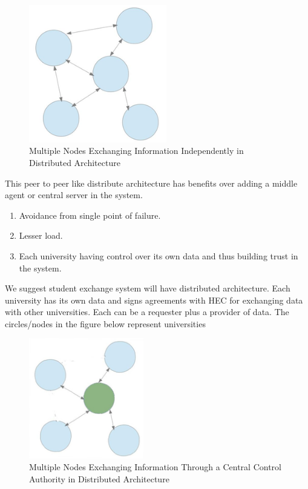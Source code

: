 \documentclass[12pt,a4paper,oneside]{book}
\begin{document}
\begin{figure}[!htp]
  \centering
  \includegraphics[width=6cm]{architecture_distributed_independent_exchange.png}
  \caption{Multiple Nodes Exchanging Information Independently in Distributed Architecture \cite{The Mobility Project}}
  \label{fig:architecture_distributed_independent_exchange}
\end{figure}

This peer to peer like distribute architecture has benefits over adding a middle agent or central server in the system.

\begin{enumerate}
\item Avoidance from single point of failure.
\item Lesser load.
\item Each university having control over its own data and thus building trust in the system.	
\end{enumerate}

We suggest student exchange system will have distributed architecture. Each university has its own data and signs agreements with HEC for exchanging data with other universities. Each can be a requester plus a provider of data. The circles/nodes in the figure below represent universities

\begin{figure}[!htp]
  \centering
  \includegraphics[width=5cm]{architecture_distributed_exchange_through_hec.png}
  \caption{Multiple Nodes Exchanging Information Through a Central Control Authority in Distributed Architecture}
  \label{fig:architecture_distributed_exchange_through_hec}
\end{figure}
\end{document}
